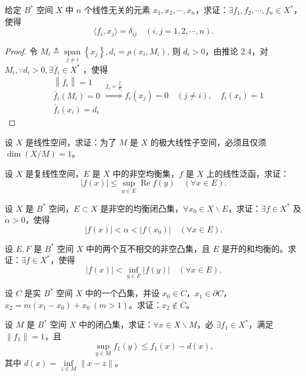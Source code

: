 \documentclass[lang=cn,newtx,10pt,scheme=chinese,thmcnt=chapter]{elegantbook}
\begin{document}
\begin{problem}
给定 $B^*$ 空间 ${X}$ 中 $n$ 个线性无关的元素 $x_1, x_2, \cdots, x_n$，求证：$\exists f_1, f_2, \cdots, f_n \in {X}^*$，使得
\[
\langle f_i, x_j \rangle = \delta_{ij} \quad (i, j = 1,2, \cdots, n).
\]
\end{problem}
\begin{proof}
令 $M_i \triangleq \operatorname{span}\limits_{j\neq i} \left\{x_j\right\}, d_i=\rho\left(x_i, M_i\right)$, 则 $d_i>0$，由推论 2.4，对 $M_i, \because d_i>0, \exists \bar{f}_i \in {X} ^*$ ，使得
\begin{equation*}
\begin{aligned}
& \left\|\bar{f}_i\right\|=1 \\
& \bar{f}_i\left(M_i\right)=0 \\
& \bar{f}_i\left(x_i\right)=d_i
\end{aligned} \stackrel{f_i=\frac{\bar{f}_i}{d_i}}{\Rightarrow} f_i\left(x_j\right)=0 \quad(j \neq i), \quad f_i\left(x_i\right)=1
\end{equation*}

\end{proof}
\begin{problem}
设 ${X}$ 是线性空间，求证：为了 $M$ 是 ${X}$ 的极大线性子空间，必须且仅须 $\operatorname{dim}({X} / M) = 1$。
\end{problem}

\begin{problem}
设 ${X}$ 是复线性空间，$E$ 是 ${X}$ 中的非空均衡集，$f$ 是 ${X}$ 上的线性泛函，求证：
\[
|f(x)| \leqslant \sup_{y \in E} \operatorname{Re} f(y) \quad (\forall x \in E).
\]
\end{problem}

\begin{problem}
设 ${X}$ 是 $B^*$ 空间，$E \subset {X}$ 是非空的均衡闭凸集，$\forall x_0 \in {X} \backslash E$，求证：$\exists f \in {X}^*$ 及 $\alpha>0$，使得
\[
|f(x)| < \alpha < \left|f\left(x_0\right)\right| \quad (\forall x \in E).
\]
\end{problem}

\begin{problem}
设 $E, F$ 是 $B^*$ 空间 ${X}$ 中的两个互不相交的非空凸集，且 $E$ 是开的和均衡的。求证：$\exists f \in {X}^*$，使得
\[
|f(x)| < \inf_{y \in F} |f(y)| \quad (\forall x \in E).
\]
\end{problem}

\begin{problem}
设 $C$ 是实 $B^*$ 空间 ${X}$ 中的一个凸集，并设 $x_0 \in \dot{C}$，$x_1 \in \partial C$，$x_2 = m(x_1 - x_0) + x_0 \ (m > 1)$。求证：$x_2 \notin \bar{C}$。
\end{problem}
\begin{problem}
设 $M$ 是 $B^*$ 空间 ${X}$ 中的闭凸集，求证：$\forall x \in {X} \backslash M$，必 $\exists f_1 \in {X}^*$，满足 $\|f_1\| = 1$，且
\[
\sup_{y \in M} f_1(y) \leqslant f_1(x) - d(x),
\]
其中 $d(x) = \inf\limits_{z \in M} \|x - z\|$。
\end{problem}
\end{document}
